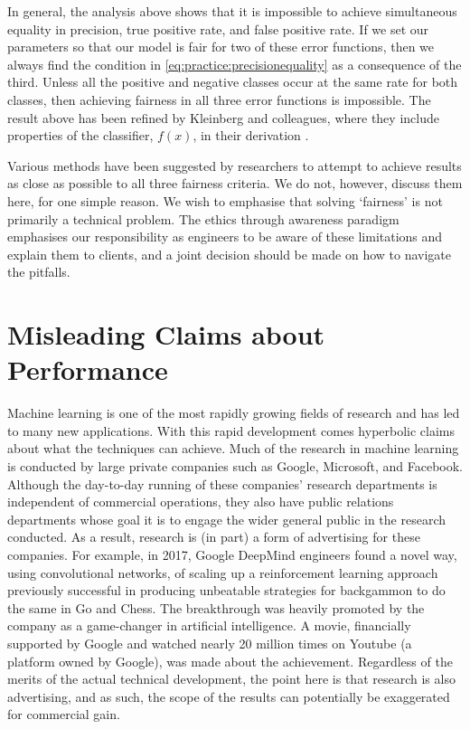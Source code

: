 In general, the analysis above shows that it is impossible to achieve simultaneous equality in precision, true positive rate, and false positive rate. If we set our parameters so that our model is fair for two of these error functions, then we always find the condition in \eqref{eq:practice:precisionequality} as a consequence of the third.\vadjust{\pagebreak} Unless all the positive and negative classes occur at the same rate for both classes, then achieving fairness in all three error functions is impossible. The result above has been refined by Kleinberg and colleagues, where they include properties of the classifier, $f(x)$, in their derivation \parencite{kleinberg2018algorithmic}.

Various methods have been suggested by researchers to attempt to achieve results as close as possible to all three fairness criteria. We do not, however, discuss them here, for one simple reason. We wish to emphasise that solving `fairness' is not primarily a technical problem. The ethics through awareness paradigm emphasises our responsibility as engineers to be aware of these limitations and explain them to clients, and a joint decision should be made on how to navigate the pitfalls.


\section{Misleading Claims about Performance}\label{ch12:sec12.2}

Machine learning is one of the most rapidly growing fields of research and has led to many new applications. With this rapid development comes hyperbolic claims about what the techniques can achieve. Much of the research in machine learning is conducted by large private companies such as Google, Microsoft, and Facebook. Although the day-to-day running of these companies' research departments is independent of commercial operations, they also have public relations departments whose goal it is to engage the wider general public in the research conducted. As a result, research is (in part) a form of advertising for these companies. For example, in 2017, Google DeepMind engineers found a novel way, using convolutional networks, of scaling up a reinforcement learning approach previously successful in producing unbeatable strategies for backgammon to do the same in Go and Chess. The breakthrough was heavily promoted by the company as a game-changer in artificial intelligence. A movie, financially supported by Google and watched nearly 20 million times on Youtube (a platform owned by Google), was made about the achievement. Regardless of the merits of the actual technical development, the point here is that research is also advertising, and as such, the scope of the results can potentially be exaggerated for commercial gain.

